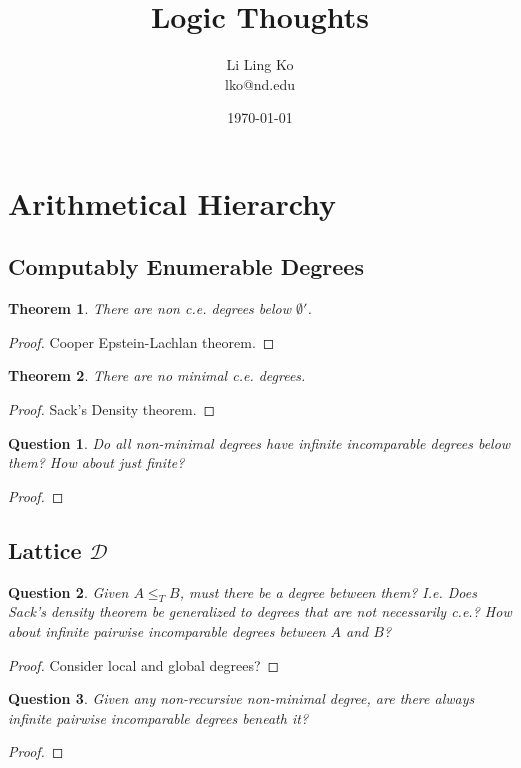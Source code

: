 \documentclass{article}
\newtheorem{theorem}{Theorem}[subsection]
\newtheorem{question}{Question}[subsection]
\begin{document}
\title{Logic Thoughts}
\author{Li Ling Ko\\ lko@nd.edu}
\date{\today}
\maketitle

\section{Arithmetical Hierarchy}
  \subsection{Computably Enumerable Degrees}
    \begin{theorem}
      There are non c.e. degrees below $\emptyset'$.
    \end{theorem}
    \begin{proof}
      Cooper Epstein-Lachlan theorem.
    \end{proof}

    \begin{theorem}
      There are no minimal c.e. degrees.
    \end{theorem}
    \begin{proof}
      Sack's Density theorem.
    \end{proof}

    \begin{question}
      Do all non-minimal degrees have infinite incomparable degrees below
      them? How about just finite?
    \end{question}
    \begin{proof}
    \end{proof}

  \subsection{Lattice $\mathcal{D}$}
    \begin{question}
      Given $A\leq_T B$, must there be a degree between them? I.e. Does
      Sack's density theorem be generalized to degrees that are not
      necessarily c.e.? How about infinite pairwise incomparable degrees
      between $A$ and $B$?
    \end{question}
    \begin{proof}
      Consider local and global degrees?
    \end{proof}

    \begin{question}
      Given any non-recursive non-minimal degree, are there always infinite
      pairwise incomparable degrees beneath it?
    \end{question}
    \begin{proof}
    \end{proof}
\end{document}
